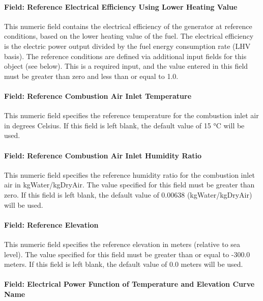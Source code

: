 \paragraph{Field: Reference Electrical Efficiency Using Lower Heating Value}\label{field-reference-electrical-efficiency-using-lower-heating-value}

This numeric field contains the electrical efficiency of the generator at reference conditions, based on the lower heating value of the fuel. The electrical efficiency is the electric power output divided by the fuel energy consumption rate (LHV basis). The reference conditions are defined via additional input fields for this object (see below). This is a required input, and the value entered in this field must be greater than zero and less than or equal to 1.0.

\paragraph{Field: Reference Combustion Air Inlet Temperature}\label{field-reference-combustion-air-inlet-temperature}

This numeric field specifies the reference temperature for the combustion inlet air in degrees Celsius. If this field is left blank, the default value of 15 °C will be used.

\paragraph{Field: Reference Combustion Air Inlet Humidity Ratio}\label{field-reference-combustion-air-inlet-humidity-ratio}

This numeric field specifies the reference humidity ratio for the combustion inlet air in kgWater/kgDryAir. The value specified for this field must be greater than zero. If this field is left blank, the default value of 0.00638 (kgWater/kgDryAir) will be used.

\paragraph{Field: Reference Elevation}\label{field-reference-elevation}

This numeric field specifies the reference elevation in meters (relative to sea level). The value specified for this field must be greater than or equal to -300.0 meters. If this field is left blank, the default value of 0.0 meters will be used.

\paragraph{Field: Electrical Power Function of Temperature and Elevation Curve Name}\label{field-electrical-power-function-of-temperature-and-elevation-curve-name}

